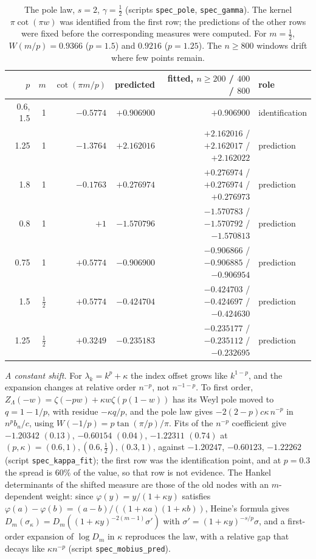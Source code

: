 \begin{table}[ht]
\centering
\small
\begin{tabular}{rrrrrl}
\toprule
$p$ & $m$ & $\cot(\pi m/p)$ & predicted & fitted, $n\ge200$ / $400$ / $800$ & role\\
\midrule
0.6, 1.5 & 1 & $-0.5774$ & $+0.906900$ & $+0.906900$ & identification\\
1.25 & 1 & $-1.3764$ & $+2.162016$ & $+2.162016$ / $+2.162017$ / $+2.162022$ & prediction\\
1.8 & 1 & $-0.1763$ & $+0.276974$ & $+0.276974$ / $+0.276974$ / $+0.276973$ & prediction\\
0.8 & 1 & $+1$ & $-1.570796$ & $-1.570783$ / $-1.570792$ / $-1.570813$ & prediction\\
0.75 & 1 & $+0.5774$ & $-0.906900$ & $-0.906866$ / $-0.906885$ / $-0.906954$ & prediction\\
1.5 & $\frac12$ & $+0.5774$ & $-0.424704$ & $-0.424703$ / $-0.424697$ / $-0.424630$ & prediction\\
1.25 & $\frac12$ & $+0.3249$ & $-0.235183$ & $-0.235177$ / $-0.235112$ / $-0.232695$ & prediction\\
\bottomrule
\end{tabular}
\caption{The pole law, $s=2$, $\gamma=\frac12$ (scripts \texttt{spec\_pole}, \texttt{spec\_gamma}). The kernel $\pi\cot(\pi w)$ was identified from
the first row; the predictions of the other rows were fixed before the corresponding measures were computed. For $m=\frac12$,
$W(m/p)=0.9366$ ($p=1.5$) and $0.9216$ ($p=1.25$). The $n\ge800$ windows drift where few points remain.}
\label{tab:pole}
\end{table}

\emph{A constant shift.} For $\lambda_k=k^p+\kappa$ the index offset grows like $k^{1-p}$, and the expansion changes at
relative order $n^{-p}$, not $n^{-1-p}$. To first order, $Z_\Lambda(-w)=\zeta(-pw)+\kappa w\zeta(p(1-w))$ has its Weyl pole moved
to $q=1-1/p$, with residue $-\kappa q/p$, and the pole law gives $-2(2-p)c\kappa\,n^{-p}$ in $n^pb_n/c$, using
$W(-1/p)=p\tan(\pi/p)/\pi$. Fits of the $n^{-p}$ coefficient give $-1.20342$ $(0.13)$, $-0.60154$ $(0.04)$, $-1.22311$ $(0.74)$
at $(p,\kappa)=(0.6,1),(0.6,\frac12),(0.3,1)$, against $-1.20247$, $-0.60123$, $-1.22262$ (script \texttt{spec\_kappa\_fit}); the
first row was the identification point, and at $p=0.3$ the spread is $60\%$ of the value, so that row is not evidence.
The Hankel determinants of the shifted measure are those of the old nodes with an $m$-dependent weight: since
$\varphi(y)=y/(1+\kappa y)$ satisfies $\varphi(a)-\varphi(b)=(a-b)/((1+\kappa a)(1+\kappa b))$, Heine's formula gives
$D_m(\sigma_\kappa)=D_m((1+\kappa y)^{-2(m-1)}\sigma')$ with $\sigma'=(1+\kappa y)^{-s/p}\sigma$, and a first-order expansion of
$\log D_m$ in $\kappa$ reproduces the law, with a relative gap that decays like $\kappa n^{-p}$ (script \texttt{spec\_mobius\_pred}).

